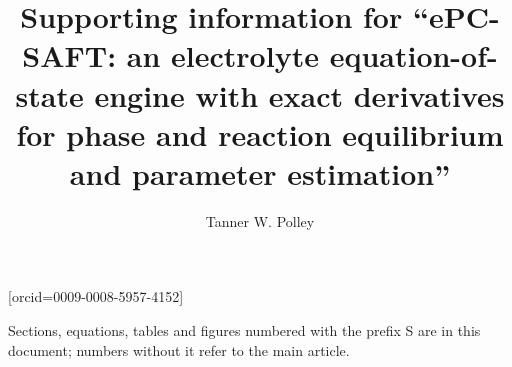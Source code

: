 \documentclass[a4paper,fleqn]{cas-sc}
\begin{document}

\title[mode = title]{Supporting information for ``ePC-SAFT: an electrolyte equation-of-state engine with exact derivatives for phase and reaction equilibrium and parameter estimation''}

\author[1]{Tanner W. Polley}[orcid=0009-0008-5957-4152]
\cormark[1]



\maketitle


\noindent Sections, equations, tables and figures numbered with the prefix S are in this document; numbers without it refer to the main article.



\clearpage


\end{document}
